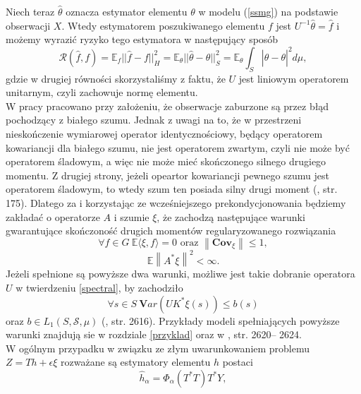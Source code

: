 \documentclass{mwart}
\newcommand{\norm}[1]{\left\lVert#1\right\rVert}
\begin{document}
Niech teraz $\hat{\theta}$ oznacza estymator elementu $\theta$ w modelu (\ref{ssmg}) na podstawie obserwacji $X$. Wtedy estymatorem poszukiwanego elementu $f$ jest $U^{-1}\hat{\theta}=\hat{f}$ i możemy wyrazić ryzyko tego estymatora w następujący sposób
\begin{displaymath}
\mathcal{R}(\hat{f},f)=\mathbb{E}_f||\hat{f}-f||_H^2=\mathbb{E}_{\theta}||\hat{\theta}-\theta||_S^2=\mathbb{E}_{\theta}\int_S|\hat{\theta}-\theta |^2d\mu ,
\end{displaymath}
gdzie w drugiej równości skorzystaliśmy z faktu, że $U$ jest liniowym operatorem unitarnym, czyli zachowuje normę elementu.\\
W pracy \cite{cavalier2} pracowano przy założeniu, że obserwacje zaburzone są przez błąd pochodzący z białego szumu. Jednak z uwagi na to, że w przestrzeni nieskończenie wymiarowej operator identycznościowy, będący operatorem kowariancji dla białego szumu, nie jest operatorem zwartym, czyli nie może być operatorem śladowym, a więc nie może mieć skończonego silnego drugiego momentu. Z drugiej strony, jeżeli opeartor kowariancji pewnego szumu jest operatorem śladowym, to wtedy szum ten posiada silny drugi moment (\cite{typek}, str. 175). Dlatego za \cite{bissantz} i korzystając ze wcześniejszego prekondycjonowania będziemy zakładać o operatorze $A$ i szumie $\xi$, że zachodzą następujące warunki gwarantujące skończoność drugich momentów regularyzowanego rozwiązania
\begin{equation}\label{warunki}
\forall f\in G\ \mathbb{E}\langle \xi, f\rangle =0\textrm{ oraz }\norm{\textbf{Cov}_{\xi}}\leq 1,
\end{equation}
\begin{displaymath}
\mathbb{E}\norm{A^*\xi}^2<\infty.
\end{displaymath}
Jeżeli spełnione są powyższe dwa warunki, możliwe jest takie dobranie operatora $U$ w twierdzeniu \ref{spectral}, by zachodziło
\begin{displaymath}
\forall s\in S\ \pmb{V}ar(UK^*\xi (s))\leq b(s)
\end{displaymath}
oraz $b\in L_1(S,\mathcal{S},\mu)$ (\cite{bissantz}, str. 2616). Przykłady modeli spełniających powyższe warunki znajdują sie w rozdziale \ref{przyklad} oraz w \cite{bissantz}, str. 2620-- 2624.\\
W ogólnym przypadku w związku ze złym uwarunkowaniem problemu $Z=Th+\epsilon\xi$ rozważane są estymatory elementu $h$  postaci 
\begin{displaymath}
\hat{h}_{\alpha}=\Phi_{\alpha}(T^*T)T^*Y,
\end{displaymath}
\end{document}
